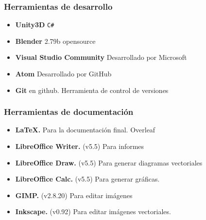 \subsubsection{Herramientas de desarrollo}

\begin{itemize}
    \item \textbf{Unity3D} \texttt{C\#}
    \item \textbf{Blender} 2.79b opensource
    \item \textbf{Visual Studio Community} Desarrollado por Microsoft
    \item \textbf{Atom} Desarrollado por GitHub
    \item \textbf{Git} en github. Herramienta de control de versiones
\end{itemize}

\subsubsection{Herramientas de documentación}

\begin{itemize}
    \item \textbf{\LaTeX.} Para la documentación final. Overleaf
    \item \textbf{LibreOffice Writer.} (v5.5) Para informes 
    \item \textbf{LibreOffice Draw.} (v5.5) Para generar diagramas vectoriales
    \item \textbf{LibreOffice Calc.} (v5.5) Para generar gráficas.
    \item \textbf{GIMP.} (v2.8.20) Para editar imágenes
    \item \textbf{Inkscape.} (v0.92) Para editar imágenes vectoriales.
\end{itemize}